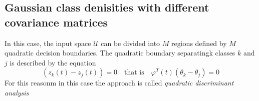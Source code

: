 \documentclass{book}
\begin{document}
\subsection{Gaussian class denisities with different covariance matrices}
In this case, the input space $\mathcal{U}$ can be divided into $M$ regions defined by $M$ quadratic decision boundaries. The quadratic boundary separatingk classes $k$ and $j$ is described by the equation 
\[
    (z_k(t)-z_j(t))=0 \quad \text{that is} \quad \varphi^T(t)(\theta_k-\theta_j)=0
\]
For this reasonm in this case the approach is called \emph{quadratic discriminant analysis}
\end{document}
